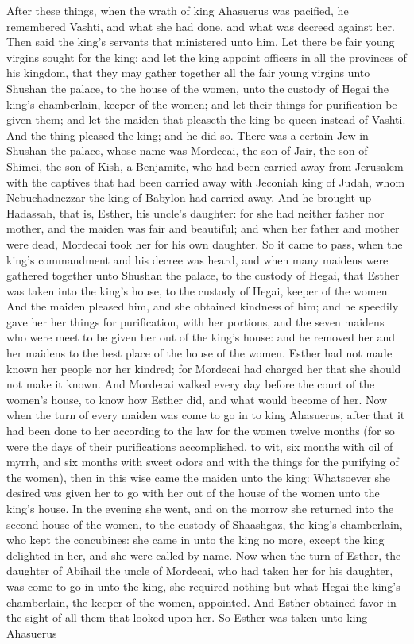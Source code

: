 After these things, when the wrath of king Ahasuerus was pacified, he remembered Vashti, and what she had done, and what was decreed against her. Then said the king’s servants that ministered unto him, Let there be fair young virgins sought for the king: and let the king appoint officers in all the provinces of his kingdom, that they may gather together all the fair young virgins unto Shushan the palace, to the house of the women, unto the custody of Hegai the king’s chamberlain, keeper of the women; and let their things for purification be given them; and let the maiden that pleaseth the king be queen instead of Vashti. And the thing pleased the king; and he did so.  There was a certain Jew in Shushan the palace, whose name was Mordecai, the son of Jair, the son of Shimei, the son of Kish, a Benjamite, who had been carried away from Jerusalem with the captives that had been carried away with Jeconiah king of Judah, whom Nebuchadnezzar the king of Babylon had carried away. And he brought up Hadassah, that is, Esther, his uncle’s daughter: for she had neither father nor mother, and the maiden was fair and beautiful; and when her father and mother were dead, Mordecai took her for his own daughter.  So it came to pass, when the king’s commandment and his decree was heard, and when many maidens were gathered together unto Shushan the palace, to the custody of Hegai, that Esther was taken into the king’s house, to the custody of Hegai, keeper of the women. And the maiden pleased him, and she obtained kindness of him; and he speedily gave her her things for purification, with her portions, and the seven maidens who were meet to be given her out of the king’s house: and he removed her and her maidens to the best place of the house of the women. Esther had not made known her people nor her kindred; for Mordecai had charged her that she should not make it known. And Mordecai walked every day before the court of the women’s house, to know how Esther did, and what would become of her.  Now when the turn of every maiden was come to go in to king Ahasuerus, after that it had been done to her according to the law for the women twelve months (for so were the days of their purifications accomplished, to wit, six months with oil of myrrh, and six months with sweet odors and with the things for the purifying of the women), then in this wise came the maiden unto the king: Whatsoever she desired was given her to go with her out of the house of the women unto the king’s house. In the evening she went, and on the morrow she returned into the second house of the women, to the custody of Shaashgaz, the king’s chamberlain, who kept the concubines: she came in unto the king no more, except the king delighted in her, and she were called by name. Now when the turn of Esther, the daughter of Abihail the uncle of Mordecai, who had taken her for his daughter, was come to go in unto the king, she required nothing but what Hegai the king’s chamberlain, the keeper of the women, appointed. And Esther obtained favor in the sight of all them that looked upon her.  So Esther was taken unto king Ahasuerus 
